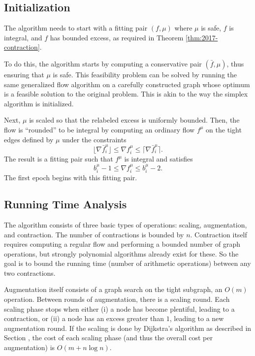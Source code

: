 \documentclass[11pt]{article}
\theoremstyle{definition}
\theoremstyle{definition}
\theoremstyle{definition}
\newcommand{\fu}{f^{\mu}}
\newcommand{\nfiu}{\nabla \fu_i}
\newcommand{\biu}{b_{i}^{\mu}}
\begin{document}
    \subsection{Initialization} \label{sec:2017-rounding}
	The algorithm needs to start with a fitting pair $(f, \mu)$ where $\mu$ is safe,
	$f$ is integral, and $f$ has bounded excess,
	as required in Theorem \ref{thm:2017-contraction}.
	
	To do this, the algorithm starts by computing a conservative pair $(\bar{f}, \mu)$,
	thus ensuring
	that $\mu$ is safe. This feasibility problem can be solved by running the same
	generalized flow algorithm on a carefully constructed graph whose optimum is a feasible
	solution to the original problem. This is akin to the way the
	simplex algorithm is initialized.
	
	Next, $\mu$ is scaled so that the relabeled excess is uniformly bounded.
	Then, the flow
	is ``rounded'' to be integral by computing an ordinary flow $f^\mu$ on the tight edges
	defined by $\mu$ under the constraints
	\[ \lfloor \nabla \bar{f}^\mu_i \rfloor \leq \nfiu
	 \leq \lceil \nabla \bar{f}^\mu_i \rceil. \]
	The result is a fitting pair such that $f^\mu$ is integral and satisfies
	\[ \biu - 1 \leq \nfiu \leq \biu - 2. \]
	The first epoch begins with this fitting pair.

    \subsection{Running Time Analysis}
    The algorithm consists of three basic types of operations: scaling, augmentation, and contraction.
    The number of contractions is bounded by $n$. Contraction itself
    requires computing a regular flow and performing a bounded number of graph operations, but
    strongly polynomial algorithms already exist for these. So the goal is to bound the running time
    (number of arithmetic operations) between any two contractions.

    Augmentation itself consists of a graph search on the tight subgraph, an $O(m)$ operation.
    Between rounds of augmentation, there is a scaling round. Each scaling phase stops
    when either (i) a node has become plentiful, leading to a contraction, or (ii) a node has an
    excess greater than $1$, leading to a new augmentation round.
    If the scaling is done by Dijkstra's algorithm as
    described in Section \label{sec:sub-ppn},
    the cost of each scaling phase (and thus the overall cost per augmentation) is
    $O(m + n \log n)$.
\end{document}
